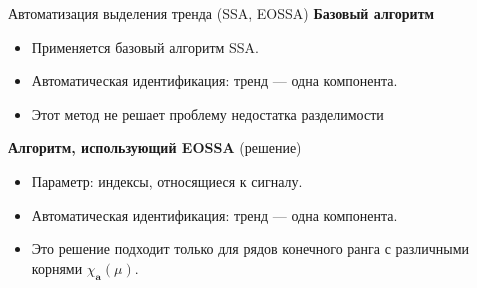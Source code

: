 \documentclass[ucs, notheorems, handout]{beamer}
\begin{document}
\begin{frame}{Автоматизация выделения тренда (SSA, EOSSA)}
    \textbf{Базовый алгоритм}
        \begin{itemize}
            \item Применяется базовый алгоритм SSA.
            \item Автоматическая идентификация:  тренд --- одна компонента.
            \item Этот метод не решает проблему недостатка разделимости
        \end{itemize}
        \pause
        \normalsize
    \textbf{Алгоритм, использующий EOSSA} (решение)

        \begin{itemize}
            \item Параметр: индексы, относящиеся к сигналу.
            \item Автоматическая идентификация: тренд --- одна компонента.
            \item Это решение подходит только для рядов конечного ранга с различными корнями $\chi_{\mathbf{a}} (\mu )$.
        \end{itemize}
\end{frame}
\end{document}
